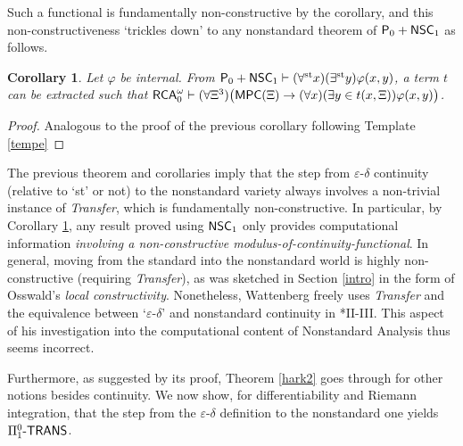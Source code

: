 \documentclass[reqno]{amsart}
\newtheorem{cor}[thm]{Corollary}
\def\RCAo{\textup{\textsf{RCA}}_{0}^{\omega}}
\def\P{\textup{\textsf{P}}}
\def\st{\textup{st}}
\def\di{\rightarrow}
\def\eps{\varepsilon}
\def\paai{\Pi_{1}^{0}\textup{-\textsf{TRANS}}}
\def\MPC{\textup{\textsf{MPC}}}
\def\NSC{\textup{\textsf{NSC}}}
\numberwithin{equation}{section}
\numberwithin{thm}{section}
\begin{document}
Such a functional is fundamentally non-constructive by the corollary, and this non-constructiveness `trickles down' to any nonstandard theorem of $\P_{0}+\NSC_{1}$ as follows.
\begin{cor}\label{idare56} Let $\varphi$ be internal.
From $\P_{0}+ \NSC_{1}\vdash (\forall^{\st}x)(\exists^{\st}y)\varphi(x, y)$, a term $t$ can be extracted such that $\RCAo\vdash (\forall \Xi^{3})\big(\MPC(\Xi)\di  (\forall x)(\exists y\in t(x, \Xi))\varphi(x, y)  \big)$.
\end{cor}
\begin{proof}
Analogous to the proof of the previous corollary following Template \ref{tempe}  
\end{proof}
The previous theorem and corollaries imply that the step from $\eps$-$\delta$ continuity (relative to `st' or not) to the nonstandard variety always involves a non-trivial instance of \emph{Transfer}, which is fundamentally non-constructive.  In particular, by Corollary \ref{idare56}, any result proved using $\NSC_{1}$ only provides computational information \emph{involving a non-constructive modulus-of-continuity-functional}.  
In general, moving from the standard into the nonstandard world is highly non-constructive (requiring \emph{Transfer}), as was sketched in Section \ref{intro} in the form of Osswald's \emph{local constructivity}.     
Nonetheless, Wattenberg freely uses \emph{Transfer} and the equivalence between `$\eps$-$\delta$' and nonstandard continuity in \cite{watje}*{II-III}.  %
This aspect of his investigation into the computational content of Nonstandard Analysis thus seems incorrect.  

\medskip

%
%
Furthermore, as suggested by its proof, Theorem \ref{hark2} goes through for other notions besides continuity.  
We now show, for differentiability and Riemann integration, that the step from the $\eps$-$\delta$ definition to the nonstandard one yields $\paai$.  

\medskip
\end{document}
